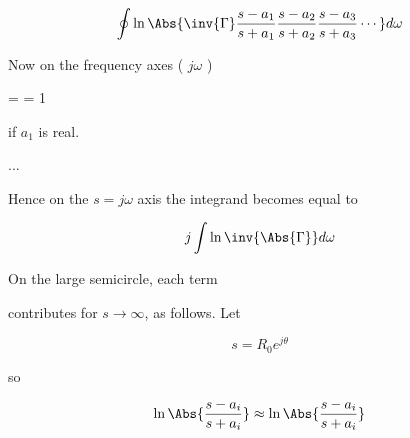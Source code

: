 \begin{equation}\label{eqn:uwavesDeck8ResonatorQfactorCore:n}
\oint \ln \Abs{ \inv{\Gamma}
\frac{s - a_1}{s+ a_1}
\frac{s - a_2}{s+ a_2}
\frac{s - a_3}{s+ a_3}
\cdots
} d\omega
\end{equation}

Now on the frequency axes ( \( j \omega \) )

 =
 = 1

if \( a_1 \) is real.

...

Hence on the \( s = j \omega \) axis the integrand becomes equal to

\begin{equation}\label{eqn:uwavesDeck8ResonatorQfactorCore:n}
j \int \ln \inv{\Abs{\Gamma}} d\omega
\end{equation}

On the large semicircle, each term

\ln {} contributes for \( s \rightarrow \infty \), as follows.  Let

\begin{equation}\label{eqn:uwavesDeck8ResonatorQfactorCore:n}
s = R_0 e^{j \theta}
\end{equation}

so

\begin{equation}\label{eqn:uwavesDeck8ResonatorQfactorCore:n}
\ln \Abs{\frac{s - a_i}{s + a_i} }
\approx
\ln \Abs{\frac{s - a_i}{s + a_i} }
\end{equation}
